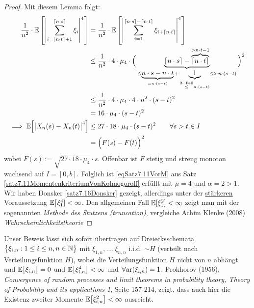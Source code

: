 \begin{proof}
Mit diesem Lemma folgt:
\begin{align*}
\frac{1}{n^2}\cdot\mathbb{E}\left[\left|\sum\limits_{i=\lceil n\cdot t\rceil+1}^{\lceil n\cdot s\rceil}\xi_i\right|^4\right]
&=
\frac{1}{n^2}\cdot\mathbb{E}\left[\left|\sum\limits_{i=1}^{\lceil n\cdot s\rceil-\lceil n\cdot t\rceil}\xi_{i+\lceil n\cdot t\rceil}\right|^4\right]\\
&\leq
\frac{1}{n^2}\cdot 4\cdot\mu_4\cdot\Big(\underbrace{\lceil n\cdot s\rceil-\overbrace{\lceil n\cdot t\rceil}^{>n\cdot t-1}}_{\leq\underbrace{ n\cdot s-n\cdot t}_{=n\cdot(s-t)}+\underbrace{1}_{\stackrel{\text{2. Fall}}{\leq}n\cdot(s-t)}\leq2\cdot n\cdot(s-t)}\Big)^2\\
&\leq
\frac{1}{n^2}\cdot 4\cdot\mu_4\cdot 4\cdot n^2\cdot(s-t)^2\\
&=16\cdot\mu_4\cdot(s-t)^2\\
\implies
\mathbb{E}\Big[\big|X_n(s)-X_n(t)\big|^4\Big]
&\leq 27\cdot18\cdot\mu_4\cdot(s-t)^2\qquad\forall s>t\in I\\
&=\Big(F(s)-F(t)\Big)^2
\end{align*}
wobei $F(s):=\sqrt{27\cdot18\cdot\mu_4}\cdot s$. Offenbar ist $F$ stetig und streng monoton wachsend auf $I=[0,b]$. Folglich ist \eqref{eqSatz7.11VorM} aus Satz \ref{satz7.11MomentenkriteriumVonKolmogoroff} erfüllt mit $\mu=4$ und $\alpha=2>1$.\nl
Wir haben Donsker \ref{satz7.16Donsker} gezeigt, allerdings unter der \ul{stärkeren} Voraussetzung $\mathbb{E}\big[\xi_1^4]<\infty$. Den allgemeinen Fall $\mathbb{E}[\xi_1^2]<\infty$ zeigt man mit der sogenannten \textit{Methode des Stutzens (truncation)}, vergleiche Achim Klenke (2008) \textit{Wahrscheinlichkeitstheorie}
\end{proof}


\setcounter{satz}{15}
\begin{bemerkungnr}\label{bemerkung7.16Einhalb} %
Unser Beweis lässt sich sofort übertragen auf Dreiecksschemata\\ $\big\lbrace\xi_{i,n}:1\leq i\leq n,n\in\mathbb{N}\big\rbrace$ mit $\xi_{1,n},\ldots,\xi_{n,n}$ i.i.d. $\sim H$ (verteilt nach Verteilungsfunktion $H$), wobei die Verteilungsfunktion $H$ nicht von $n$ abhängt und $\mathbb{E}\big[\xi_{i,n}\big]=0$ und $\mathbb{E}\big[\xi_{i,n}^4\big]<\infty$ und $\mathbb{V}\text{ar}(\xi_{i,n})=1$. \nl
Prokhorov (1956), \textit{Convergence of random processes and limit theorems in probability theory, Theory of Probability and its applications 1}, Seite 157-214, zeigt, dass auch hier die Existenz zweiter Momente $\mathbb{E}\big[\xi_{i,n}^2\big]<\infty$ ausreicht.
\end{bemerkungnr}

